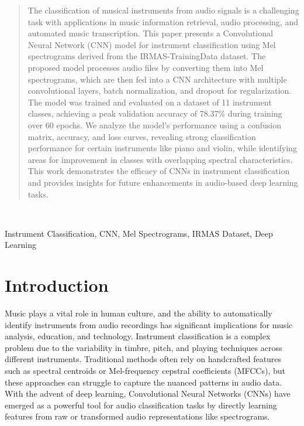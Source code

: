\documentclass[conference]{IEEEtran}
\begin{document}
\begin{abstract}
The classification of musical instruments from audio signals is a challenging task with applications in music information retrieval, audio processing, and automated music transcription. This paper presents a Convolutional Neural Network (CNN) model for instrument classification using Mel spectrograms derived from the IRMAS-TrainingData dataset. The proposed model processes audio files by converting them into Mel spectrograms, which are then fed into a CNN architecture with multiple convolutional layers, batch normalization, and dropout for regularization. The model was trained and evaluated on a dataset of 11 instrument classes, achieving a peak validation accuracy of 78.37\% during training over 60 epochs. We analyze the model’s performance using a confusion matrix, accuracy, and loss curves, revealing strong classification performance for certain instruments like piano and violin, while identifying areas for improvement in classes with overlapping spectral characteristics. This work demonstrates the efficacy of CNNs in instrument classification and provides insights for future enhancements in audio-based deep learning tasks.
\end{abstract}
\
\begin{IEEEkeywords}
Instrument Classification, CNN, Mel Spectrograms, IRMAS Dataset, Deep Learning
\end{IEEEkeywords}

\section{Introduction}
Music plays a vital role in human culture, and the ability to automatically identify instruments from audio recordings has significant implications for music analysis, education, and technology. Instrument classification is a complex problem due to the variability in timbre, pitch, and playing techniques across different instruments. Traditional methods often rely on handcrafted features such as spectral centroids or Mel-frequency cepstral coefficients (MFCCs), but these approaches can struggle to capture the nuanced patterns in audio data. With the advent of deep learning, Convolutional Neural Networks (CNNs) have emerged as a powerful tool for audio classification tasks by directly learning features from raw or transformed audio representations like spectrograms.
\end{document}
